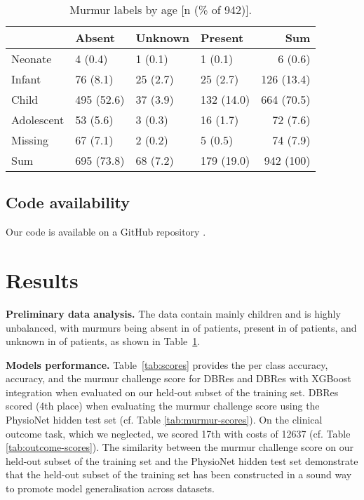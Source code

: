 \documentclass[twocolumn]{cinc}
\begin{document}
\begin{table}[htbp]
\caption{Murmur labels by age [n (\% of 942)].}
\smallskip
\label{tab:murmur_outcome}
\small\renewcommand{\arraystretch}{1.2}
\begin{tabular}{llllr} \hline
            &Absent        &Unknown       &Present       &Sum \\
            \hline\hline
Neonate     & 4 (0.4)       & 1 (0.1)       & 1 (0.1)       & 6 (0.6) \\
Infant      & 76 (8.1)      & 25 (2.7)      & 25 (2.7)      & 126 (13.4) \\
Child       & 495 (52.6)    & 37 (3.9)      & 132 (14.0)    & 664 (70.5) \\
Adolescent  & 53 (5.6)      & 3 (0.3)       & 16 (1.7)      & 72 (7.6) \\
Missing     & 67 (7.1)      & 2 (0.2)       & 5 (0.5)       & 74 (7.9) \\
\hline\hline
Sum        & 695 (73.8)    & 68 (7.2)      & 179 (19.0)    & 942 (100) \\\hline
\bottomrule
\end{tabular}
\end{table}

\subsection{Code availability}
Our code is available on a GitHub repository \cite{Walker22}.

\section{Results}
{\bf Preliminary data analysis.} The data contain mainly children and is highly unbalanced, with murmurs being absent in  of patients, present in  of patients, and unknown in  of patients, as shown in Table~\ref{tab:murmur_outcome}. 



{\bf Models performance.} Table~\ref{tab:scores} provides the per class accuracy, accuracy, and the murmur challenge score for DBRes and DBRes with XGBoost integration when evaluated on our held-out subset of the training set. DBRes scored  (4th place) when evaluating the murmur challenge score using the PhysioNet hidden test set (cf. Table \ref{tab:murmur-scores}). On the clinical outcome task, which we neglected, we scored 17th with costs of 12637 (cf. Table \ref{tab:outcome-scores}). The similarity between the murmur challenge score on our held-out subset of the training set and the PhysioNet hidden test set demonstrate that the held-out subset of the training set has been constructed in a sound way to promote model generalisation across datasets.
\end{document}
